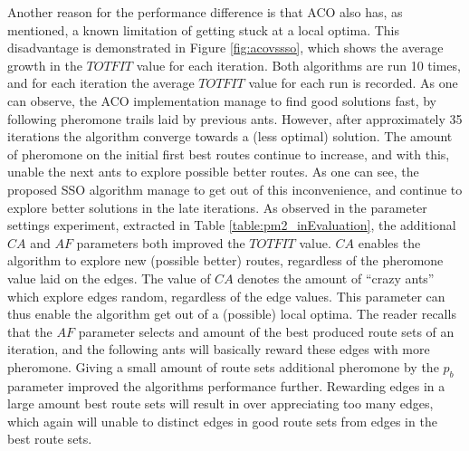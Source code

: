 Another reason for the performance difference is that ACO also has, as mentioned, a known limitation of getting stuck at a local optima. This disadvantage is demonstrated in Figure \ref{fig:acovssso}, which shows the average growth in the $TOTFIT$ value for each iteration. Both algorithms are run 10 times, and for each iteration the average $TOTFIT$ value for each run is recorded. As one can observe, the ACO implementation manage to find good solutions fast, by following pheromone trails laid by previous ants. However, after approximately 35 iterations the algorithm converge towards a (less optimal) solution. The amount of pheromone on the initial first best routes continue to increase, and with this, unable the next ants to explore possible better routes. As one can see, the proposed SSO algorithm manage to get out of this inconvenience, and continue to explore better solutions in the late iterations. As observed in the parameter settings experiment, extracted in Table \vref{table:pm2_inEvaluation}, the additional $CA$ and $AF$ parameters both improved the $TOTFIT$ value. %
$CA$ enables the algorithm to explore new (possible better) routes, regardless of the pheromone value laid on the edges. The value of $CA$ denotes the amount of ``crazy ants'' which explore edges random, regardless of the edge values. This parameter can thus enable the algorithm get out of a (possible) local optima. The reader recalls that the $AF$ parameter selects and amount of the best produced route sets of an iteration, and the following ants will basically reward these edges with more pheromone. Giving a small amount of route sets additional pheromone by the $p_b$ parameter improved the algorithms performance further. Rewarding edges in a large amount best route sets will result in over appreciating too many edges, which again will unable to distinct edges in good route sets from edges in the best route sets.


